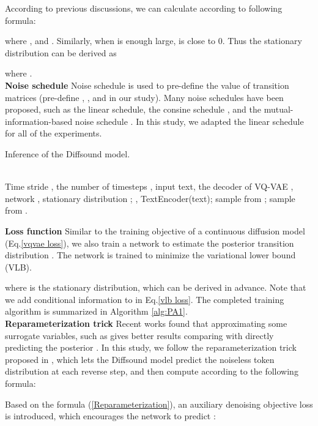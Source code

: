\documentclass[lettersize,journal]{IEEEtran}
\begin{document}
According to previous discussions, we can calculate  according to following formula:
 
where ,  and .
Similarly, when  is enough large,  is close to 0. Thus the stationary distribution  can be derived as

where . \\
\textbf{Noise schedule} Noise schedule is used to pre-define the value of transition matrices (pre-define , , and  in our study). Many noise schedules have been proposed, such as the linear schedule, the consine schedule \cite{nichol2021improved}, and the mutual-information-based noise schedule \cite{austin2021structured}. In this study, we adapted the linear schedule for all of the experiments. \\
\begin{algorithm}[t]
\caption{Inference of the Diffsound model.}
\label{alg:PA2}
\begin{algorithmic}[1]
\REQUIRE ~~\\
    Time stride , the number of timesteps , input text, the decoder of VQ-VAE , network , stationary distribution ;
    \STATE , TextEncoder(text);
    \STATE sample  from ;
    \WHILE{}
    \STATE  sample from 
    \STATE 
    \ENDWHILE
\RETURN  .
\end{algorithmic}
\end{algorithm}
\textbf{Loss function}
Similar to the training objective of a continuous diffusion model (Eq.\ref{vqvae loss}), we also train a network  to estimate the posterior transition distribution . The network is trained to minimize the variational lower bound (VLB).

where  is the stationary distribution, which can be derived in advance. 
Note that we add conditional information  to  in Eq.\ref{vlb loss}. 
The completed training algorithm is summarized in Algorithm \ref{alg:PA1}.\\
\textbf{Reparameterization trick} Recent works \cite{gu2021vector,nichol2021improved} found that approximating some surrogate variables, {\color{black}such as  gives better results comparing with directly predicting the posterior .} In this study, we follow the reparameterization trick proposed in \cite{gu2021vector}, which lets the Diffsound model predict the noiseless token distribution  at each reverse step, and then compute  according to the following formula:

Based on the formula (\ref{Reparameterization}), an auxiliary denoising objective loss is introduced, which encourages the network to predict :
\end{document}
